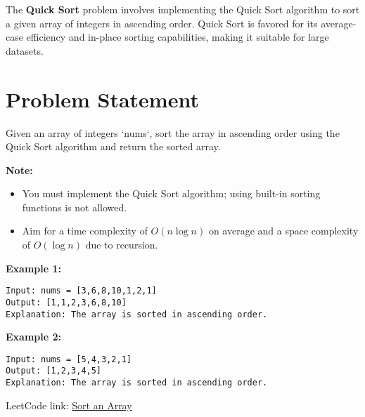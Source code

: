 
\label{problem:quick_sort}
    
The \textbf{Quick Sort} problem involves implementing the Quick Sort algorithm to sort a given array of integers in ascending order. Quick Sort is favored for its average-case efficiency and in-place sorting capabilities, making it suitable for large datasets.

\section*{Problem Statement}
Given an array of integers `nums`, sort the array in ascending order using the Quick Sort algorithm and return the sorted array.

\textbf{Note:} 
\begin{itemize}
    \item You must implement the Quick Sort algorithm; using built-in sorting functions is not allowed.
    \item Aim for a time complexity of \(O(n \log n)\) on average and a space complexity of \(O(\log n)\) due to recursion.
\end{itemize}

\textbf{Example 1:}

\begin{verbatim}
Input: nums = [3,6,8,10,1,2,1]
Output: [1,1,2,3,6,8,10]
Explanation: The array is sorted in ascending order.
\end{verbatim}

\textbf{Example 2:}

\begin{verbatim}
Input: nums = [5,4,3,2,1]
Output: [1,2,3,4,5]
Explanation: The array is sorted in ascending order.
\end{verbatim}

LeetCode link: \href{https://leetcode.com/problems/sort-an-array/}{Sort an Array}


